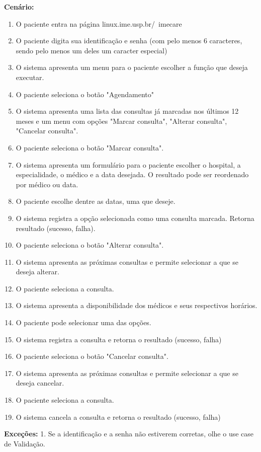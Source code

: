 \documentclass[12pt,a4paper]{report}
\begin{document}
\textbf{Cenário:}
\begin{enumerate}

\item O paciente entra na página linux.ime.usp.br/~imecare
\item O paciente digita sua identificação e senha (com pelo menos 6 caracteres, sendo pelo menos um deles um caracter especial)
\item O sistema apresenta um menu para o paciente escolher a função que deseja executar.
\item O paciente seleciona o botão "Agendamento"
\item O sistema apresenta uma lista das consultas já marcadas nos últimos 12 meses e um menu com opções "Marcar consulta", "Alterar consulta", "Cancelar consulta".
\item O paciente seleciona o botão "Marcar consulta". 
\item O sistema apresenta um formulário para o paciente escolher o hospital, a especialidade, o médico e a data desejada. O resultado pode ser reordenado por médico ou data.
\item O paciente escolhe dentre as datas, uma que deseje. 
\item O sistema registra a opção selecionada como uma consulta marcada. Retorna resultado (sucesso, falha).
\item O paciente seleciona o botão "Alterar consulta".
\item O sistema apresenta as próximas consultas e permite selecionar a que se deseja alterar.
\item O paciente seleciona a consulta.
\item O sistema apresenta a disponibilidade dos médicos e seus respectivos horários.
\item O paciente pode selecionar uma das opções.
\item O sistema registra a consulta e retorna o resultado (sucesso, falha)
\item O paciente seleciona o botão "Cancelar consulta".
\item O sistema apresenta as próximas consultas e permite selecionar a que se deseja cancelar.
\item O paciente seleciona a consulta.
\item O sistema cancela a consulta e retorna o resultado (sucesso, falha)

\end{enumerate}

\textbf{Exceções:}
1. Se a identificação e a senha não estiverem corretas, olhe o use case de Validação.\newline
\end{document}
